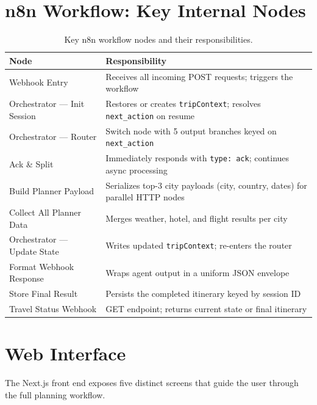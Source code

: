\documentclass[12pt,a4paper]{report}
\begin{document}
\section{n8n Workflow: Key Internal Nodes}
\begin{table}[H]
\centering
\small
\renewcommand{\arraystretch}{1.3}
\begin{tabularx}{\textwidth}{
    >{\raggedright\arraybackslash}p{5.0cm}
    >{\raggedright\arraybackslash}X}
\toprule
\textbf{Node} & \textbf{Responsibility} \\
\midrule
Webhook Entry                  & Receives all incoming POST requests; triggers the workflow \\
Orchestrator --- Init Session  & Restores or creates \texttt{tripContext}; resolves \texttt{next\_action} on resume \\
Orchestrator --- Router        & Switch node with 5 output branches keyed on \texttt{next\_action} \\
Ack \& Split                   & Immediately responds with \texttt{type: ack}; continues async processing \\
Build Planner Payload          & Serializes top-3 city payloads (city, country, dates) for parallel HTTP nodes \\
Collect All Planner Data       & Merges weather, hotel, and flight results per city \\
Orchestrator --- Update State  & Writes updated \texttt{tripContext}; re-enters the router \\
Format Webhook Response        & Wraps agent output in a uniform JSON envelope \\
Store Final Result             & Persists the completed itinerary keyed by session ID \\
Travel Status Webhook          & GET endpoint; returns current state or final itinerary \\
\bottomrule
\end{tabularx}
\caption{Key n8n workflow nodes and their responsibilities.}
\label{tab:n8nnodes}
\end{table}
\section{Web Interface}

The Next.js front end exposes five distinct screens that guide the user through the full planning
workflow.
\end{document}
